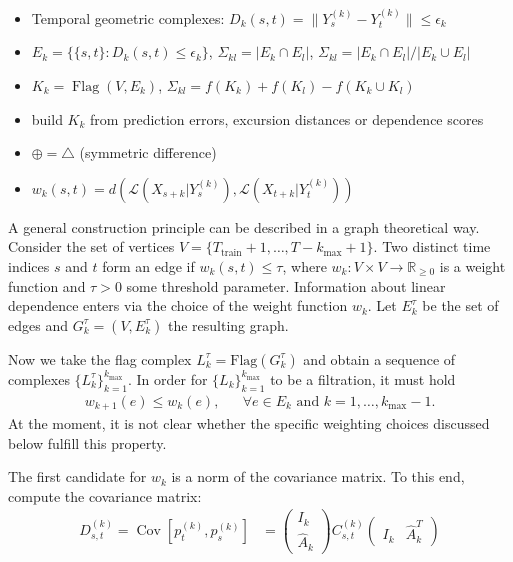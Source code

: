 \begin{itemize}
    \item Temporal geometric complexes: $D_k(s,t)=\|Y_s^{(k)}-Y_t^{(k)}\|\le\epsilon_k$
    \item $E_k=\{\{s,t\}:D_k(s,t)\le\epsilon_k\}$, $\Sigma_{kl}=|E_k\cap E_l|$, $\Sigma_{kl}=|E_k\cap E_l|/|E_k\cup E_l|$
    \item $K_k=\operatorname{Flag}(V,E_k)$, $\Sigma_{kl}=f(K_k)+f(K_l)-f(K_k\cup K_l)$
    \item build $K_k$ from prediction errors, excursion distances or dependence scores
    \item $\oplus=\triangle$ (symmetric difference)
    \item $w_k(s,t)=d(\mathcal{L}(X_{s+k}|Y_s^{(k)}),\mathcal{L}(X_{t+k}|Y_t^{(k)}))$
\end{itemize}



A general construction principle can be described in a graph theoretical way. Consider the set of vertices $V=\{T_{\text{train}}+1,\dots,T-k_{\max}+1\}$. Two distinct time indices $s$ and $t$ form an edge if $w_k(s,t)\le\tau$, where $w_k:V\times V\to\mathbb{R}_{\ge0}$ is a weight function and $\tau>0$ some threshold parameter. Information about linear dependence enters via the choice of the weight function $w_k$. Let $E_k^{\tau}$ be the set of edges and $G_k^{\tau}=(V,E_k^{\tau})$ the resulting graph.

Now we take the flag complex $L_k^{\tau}=\text{Flag}(G_k^{\tau})$ and obtain a sequence of complexes $\{L_k^{\tau}\}_{k=1}^{k_{\max}}$. In order for $\{L_k\}_{k=1}^{k_{\max}}$ to be a filtration, it must hold
\begin{align*}
    w_{k+1}(e)\le w_{k}(e),&&\forall e\in E_k\text{ and }k=1,\dots,k_{\max}-1.
\end{align*}
At the moment, it is not clear whether the specific weighting choices discussed below fulfill this property.

The first candidate for $w_k$ is a norm of the covariance matrix. To this end, compute the covariance matrix:
\begin{align*}
    D_{s,t}^{(k)}=\operatorname{Cov}\left[p_t^{(k)},p_s^{(k)}\right]&=\begin{pmatrix}
        I_k\\
        \hat{A}_k
    \end{pmatrix}C_{s,t}^{(k)}\begin{pmatrix}
        I_k & \hat{A}_k^{T}
    \end{pmatrix}
\end{align*}

